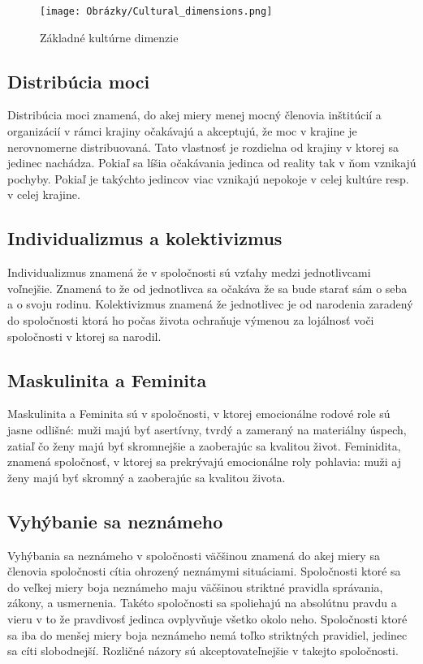 \documentclass[10pt,twoside,slovak,a4paper]{article}
\begin{document}
\begin{figure}[H]
	\centering
	\texttt{[image: Obrázky/Cultural\_dimensions.png]}
	\caption{Základné kultúrne dimenzie~\cite{hofstede2010cultures}}
	\label{fig:culture}
\end{figure}

\subsection{Distribúcia moci}\label{kultura:moc}

Distribúcia moci znamená, do akej miery menej mocný členovia inštitúcií a organizácií v
rámci krajiny očakávajú a akceptujú, že moc v krajine je nerovnomerne distribuovaná. Tato
vlastnosť je rozdielna od krajiny v ktorej sa jedinec nachádza. Pokiaľ sa líšia očakávania
jedinca od reality tak v ňom vznikajú pochyby. Pokiaľ je takýchto jedincov viac vznikajú
nepokoje v celej kultúre resp. v celej krajine.

\subsection{Individualizmus a kolektivizmus}\label{kultura:etika}

Individualizmus znamená že v spoločnosti sú vzťahy medzi jednotlivcami voľnejšie. Znamená
to že od jednotlivca sa očakáva že sa bude starať sám o seba a o svoju rodinu. Kolektivizmus
znamená že jednotlivec je od narodenia zaradený do spoločnosti ktorá ho počas života ochraňuje
výmenou za lojálnosť voči spoločnosti v ktorej sa narodil.

\subsection{Maskulinita a Feminita}\label{kultura:masfem}

Maskulinita a Feminita sú v spoločnosti, v ktorej emocionálne rodové role sú jasne odlišné: 
muži majú byť asertívny, tvrdý a zameraný na materiálny úspech, zatiaľ čo ženy majú
byť skromnejšie a zaoberajúc sa kvalitou život. Feminidita, znamená spoločnosť, v ktorej
sa prekrývajú emocionálne roly pohlavia: muži aj ženy majú byť skromný a zaoberajúc
sa kvalitou života.

\subsection{Vyhýbanie sa neznámeho}\label{kultura:vyhybanie}

Vyhýbania sa neznámeho v spoločnosti väčšinou znamená do akej miery sa členovia spoločnosti
cítia ohrozený neznámymi situáciami. Spoločnosti ktoré sa do veľkej miery boja neznámeho
maju väčšinou striktné pravidla správania, zákony, a usmernenia. Takéto spoločnosti sa spoliehajú
na absolútnu pravdu a vieru v to že pravdivosť jedinca ovplyvňuje všetko okolo neho. Spoločnosti
ktoré sa iba do menšej miery boja neznámeho nemá toľko striktných pravidiel, jedinec sa cíti
slobodnejší. Rozličné názory sú akceptovateľnejšie v takejto spoločnosti.
\end{document}
